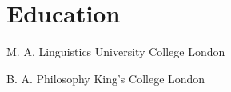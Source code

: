\documentclass[10pt,a4paper,sans]{moderncv} %
\begin{document}

\section{Education}

    { M. A. Linguistics}
    { University College London }{}{}{}

    { B. A. Philosophy}
    { King's College London }{}{}{}
\end{document}
